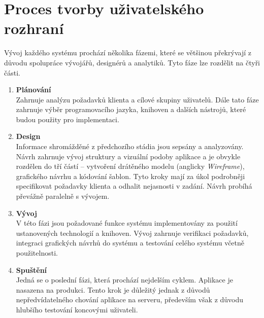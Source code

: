 \chapter{Proces tvorby uživatelského rozhraní}

\begin{quote}
\end{quote}

\noindent
Vývoj každého systému prochází několika fázemi, které se většinou překrývají z důvodu spolupráce vývojářů, designérů a analytiků. Tyto fáze lze rozdělit na čtyři části.

\begin{enumerate}[leftmargin=1cm]
    \item \textbf{Plánování}\\
          Zahrnuje analýzu požadavků klienta a cílové skupiny uživatelů. Dále tato fáze zahrnuje výběr programovacího jazyka, knihoven a dalších nástrojů, které budou použity pro implementaci.

    \item \textbf{Design}\\
          Informace shromážděné z předchozího stádia jsou sepsány a analyzovány. Návrh zahrnuje vývoj struktury a vizuální podoby aplikace a je obvykle rozdělen do tří částí -- vytvoření drátěného modelu (anglicky \textit{Wireframe}), grafického návrhu a kódování šablon. Tyto kroky mají za úkol podrobněji specifikovat požadavky klienta a odhalit nejasnosti v zadání. Návrh probíhá převážně paralelně s vývojem.

    \item \textbf{Vývoj}\\
          V této fázi jsou požadované funkce systému implementovány za použití ustanovených technologií a knihoven. Vývoj zahrnuje verifikaci požadavků, integraci grafických návrhů do systému a testování celého systému včetně použitelnosti.

    \item \textbf{Spuštění}\\
           Jedná se o poslední fázi, která prochází nejdelším cyklem. Aplikace je nasazena na produkci. Tento krok je důležitý jednak z důvodů nepředvídatelného chování aplikace na serveru, především však z důvodu hlubšího testování koncovými uživateli.

\end{enumerate}

